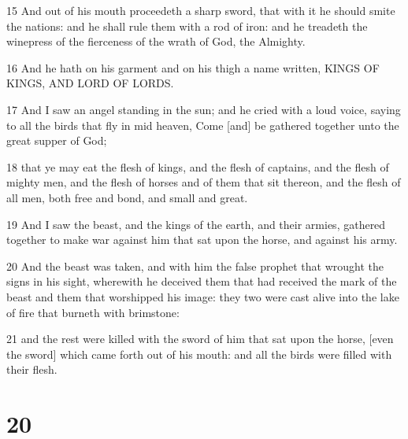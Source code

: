 \par 15 And out of his mouth proceedeth a sharp sword, that with it he should smite the nations: and he shall rule them with a rod of iron: and he treadeth the winepress of the fierceness of the wrath of God, the Almighty.
\par 16 And he hath on his garment and on his thigh a name written, KINGS OF KINGS, AND LORD OF LORDS.
\par 17 And I saw an angel standing in the sun; and he cried with a loud voice, saying to all the birds that fly in mid heaven, Come [and] be gathered together unto the great supper of God;
\par 18 that ye may eat the flesh of kings, and the flesh of captains, and the flesh of mighty men, and the flesh of horses and of them that sit thereon, and the flesh of all men, both free and bond, and small and great.
\par 19 And I saw the beast, and the kings of the earth, and their armies, gathered together to make war against him that sat upon the horse, and against his army.
\par 20 And the beast was taken, and with him the false prophet that wrought the signs in his sight, wherewith he deceived them that had received the mark of the beast and them that worshipped his image: they two were cast alive into the lake of fire that burneth with brimstone:
\par 21 and the rest were killed with the sword of him that sat upon the horse, [even the sword] which came forth out of his mouth: and all the birds were filled with their flesh.

\chapter{20}

